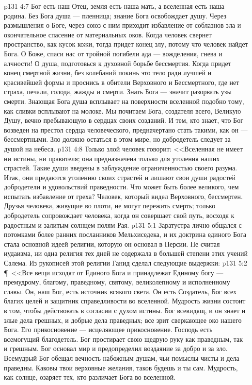\vs p131 4:7 Бог есть наш Отец, земля есть наша мать, а вселенная есть наша родина. Без Бога душа --- пленница; знание Бога освобождает душу. Через размышления о Боге, через союз с ним приходит избавление от соблазнов зла и окончательное спасение от материальных оков. Когда человек свернет пространство, как кусок кожи, тогда придет конец злу, потому что человек найдет Бога. О Боже, спаси нас от тройной погибели ада --- вожделения, гнева и алчности! О душа, подготовься к духовной борьбе бессмертия. Когда придет конец смертной жизни, без колебаний покинь это тело ради лучшей и красивейшей формы и проснись в обители Верховного и Бессмертного, где нет страха, печали, голода, жажды и смерти. Знать Бога --- значит разорвать узы смерти. Знающая Бога душа всплывает на поверхности вселенной подобно тому, как сливки всплывают на молоке. Мы почитаем Бога, создателя всего, Великую Душу, вечно пребывающую в сердцах своих созданий. И тем, кто знает, что Бог возведен на престол сердца человеческого, предначертано стать такими, как он --- бессмертными. Зло должно остаться в этом мире, но добродетель следует за душой на небеса.
\vs p131 4:8 Только злой человек говорит: <<Вселенная не имеет ни истины, ни правителя; она предназначена только для утоления наших страстей. Такие души введены в заблуждение ограниченностью своего разума. Итак, они предаются утолению своих страстей и лишают свои души радостей добродетели и удовольствий праведности. Что может быть более великого, чем испытать избавление от греха? Человек, который видел Верховного, бессмертен. Друзья человека, живущие во плоти, не могут пережить смерть; только добродетель сопровождает человека, когда он совершает свой путь, восходя к радостным и залитым солнцем полям Рая.
\vs p131 5:1 Заратустра лично общался с потомками более ранних посланников Мельхиседека, и их доктрина единого Бога стала основной идеей религии, которую он основал в Персии. Не считая иудаизма, ни одна религия тех дней не содержала в большей степени этих учений Салема. Из рукописей этой религии Ганид сделал следующие выдержки:
\vs p131 5:2 \P\ <<Все вещи исходят от Единого Бога и принадлежат Единому богу --- премудрому, благому, праведному, святому, великолепному и исполненному славы. Он, наш Бог, есть источник всякого света. Он есть Создатель, Бог всех благих целей и защитник справедливости во вселенной. Мудрость жизни состоит в том, чтобы действовать в согласии с духом истины. Бог всевидящ, и он знает и злые дела грешных, и добрые дела праведных; все зрит сверкающее око нашего Бога. Его прикосновение --- исцеляющее прикосновение. Господь есть всемогущий благодетель. Бог простирает свою щедрую руку как праведным, так и грешным. Бог основал мир и предопределил воздаяние за добро и за зло. Всемудрый Бог обещал вечность набожным душам, чьи помыслы чисты и дела праведны. Каковы твои верховные желания, таков будешь и ты сам. Мудрость, как солнце, озаряет тех, кто различает Бога во вселенной.

